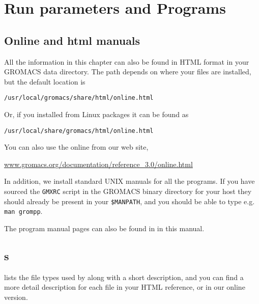%
% 
% 
% 
% 
% 
% 
% 
% 
%

\chapter{Run parameters and Programs}
\label{ch:programs}

\section{Online and html manuals}
All the information in this chapter can also be found in HTML
format in your GROMACS data directory. The path depends on
where your files are installed, but the default location is \\
\centerline{\tt /usr/local/gromacs/share/html/online.html}
Or, if you installed from Linux packages it can be found as\\
\centerline{\tt /usr/local/share/gromacs/html/online.html}
You can also use the online from our web site,\\
\centerline{\href{http://www.gromacs.org/documentation/reference_3.0/online.html}{www.gromacs.org/documentation/reference\_3.0/online.html}}

In addition, we install standard UNIX manuals for all the programs. If
you have sourced the {\tt GMXRC} script in the GROMACS binary directory for
your host they should already be present in your {\tt \$MANPATH}, and you
should be able to type e.g. {\tt man grompp}.

The program manual pages can also be found in
 in this manual.

\section{s}
\label{sec:fileformats}
 lists the file types used by {\gromacs} along with
a short description, and you can find a more detail description for
each file in your HTML reference, or in our online version.


